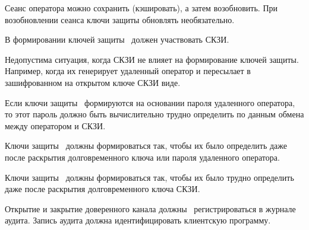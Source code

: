 \begin{note}
Сеанс оператора можно сохранить (кэшировать), а затем возобновить.
При возобновлении сеанса ключи защиты обновлять необязательно.
\end{note}

\label{R.TC.Keys}
В формировании ключей защиты~ должен участвовать СКЗИ.

\begin{note}
Недопустима ситуация, когда СКЗИ не влияет на формирование ключей защиты.
Например, когда их генерирует удаленный оператор и пересылает 
в зашифрованном на открытом ключе СКЗИ виде.
\end{note}

\label{R.TC.Pwd}
Если ключи защиты~ формируются на основании пароля
удаленного оператора, то этот пароль должно быть вычислительно
трудно определить по данным обмена между оператором и СКЗИ.

\label{R.TC.FSWeak}
Ключи защиты~ должны формироваться так, чтобы их 
было определить даже после раскрытия долговременного ключа или пароля удаленного 
оператора.

\label{R.TC.FS}
Ключи защиты~ должны формироваться так, 
чтобы их было  трудно определить даже после раскрытия 
долговременного ключа СКЗИ.

\label{R.TC.AU}
Открытие и закрытие доверенного канала должны~ 
регистрироваться в журнале аудита. Запись аудита должна идентифицировать 
клиентскую программу.




